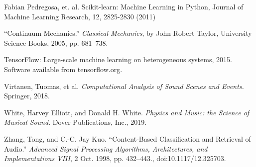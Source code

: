 \documentclass[12pt,letterpaper]{article}
\begin{document}
\begin{thebibliography}{9}
Fabian Pedregosa, et. al. Scikit-learn: Machine Learning in Python, Journal of Machine Learning Research, 12, 2825-2830 (2011) 

“Continuum Mechanics.” \textit{Classical Mechanics}, by John Robert Taylor, University Science Books, 2005, pp. 681–738. 

TensorFlow: Large-scale machine learning on heterogeneous systems,
2015. Software available from tensorflow.org.

Virtanen, Tuomas, et al. \textit{Computational Analysis of Sound Scenes and Events.} Springer, 2018.

White, Harvey Elliott, and Donald H. White. \textit{Physics and Music: the Science of Musical Sound}. Dover Publications, Inc., 2019.

Zhang, Tong, and C.-C. Jay Kuo. “Content-Based Classification and Retrieval of Audio.” \textit{Advanced Signal Processing Algorithms, Architectures, and Implementations VIII}, 2 Oct. 1998, pp. 432–443., doi:10.1117/12.325703.

\end{thebibliography}

\end{document}
